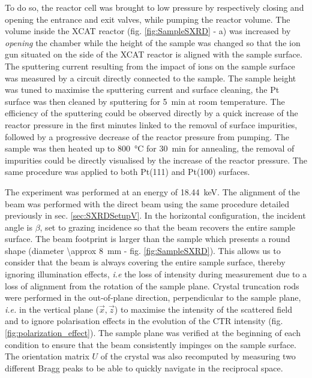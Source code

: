 To do so, the reactor cell was brought to low pressure by respectively closing and opening the entrance and exit valves, while pumping the reactor volume.
The volume inside the XCAT reactor (fig. \ref{fig:SampleSXRD} - a) was increased by \textit{opening} the chamber while the height of the sample was changed so that the ion gun situated on the side of the XCAT reactor is aligned with the sample surface.
The sputtering current resulting from the impact of ions on the sample surface was measured by a circuit directly connected to the sample.
The sample height was tuned to maximise the sputtering current and surface cleaning, the Pt surface was then cleaned by sputtering for \qty{5}{\minute} at room temperature.
The efficiency of the sputtering could be observed directly by a quick increase of the reactor pressure in the first minutes linked to the removal of surface impurities, followed by a progressive decrease of the reactor pressure from pumping.
The sample was then heated up to \qty{800}{\degreeCelsius} for \qty{30}{\minute} for annealing, the removal of impurities could be directly visualised by the increase of the reactor pressure.
The same procedure was applied to both Pt(111) and Pt(100) surfaces.

The experiment was performed at an energy of \qty{18.44}{\keV}.
The alignment of the beam was performed with the direct beam using the same procedure detailed previously in sec. \ref{sec:SXRDSetupV}.
In the horizontal configuration, the incident angle is $\beta$, set to grazing incidence so that the beam recovers the entire sample surface.
The beam footprint is larger than the sample which presents a round shape (diameter \qty{\approx 8}{\mm} - fig. \ref{fig:SampleSXRD}).
This allows us to consider that the beam is always covering the entire sample surface, thereby ignoring illumination effects, \textit{i.e} the loss of intensity during measurement due to a loss of alignment from the rotation of the sample plane.
Crystal truncation rods were performed in the out-of-plane direction, perpendicular to the sample plane, \textit{i.e.} in the vertical plane ($\vec{x}, \vec{z}$) to maximise the intensity of the scattered field and to ignore polarisation effects in the evolution of the CTR intensity (fig. \ref{fig:polarization_effect}).
The sample plane was verified at the beginning of each condition to ensure that the beam consistently impinges on the sample surface.
The orientation matrix $U$ of the crystal \parencite{Schleputz2011} was also recomputed by measuring two different Bragg peaks to be able to quickly navigate in the reciprocal space.

